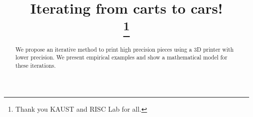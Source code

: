 \documentclass[conference]{IEEEtran}
\begin{document}
\title{Iterating from carts to cars!\\
\thanks{Thank you KAUST and RISC Lab for all.}}

\author{
\and
{}
}

\maketitle

\begin{abstract}
We propose an iterative method to print high precision pieces using a 3D printer with lower precision. We present empirical examples and show a mathematical model for these iterations.
\end{abstract}
\end{document}
